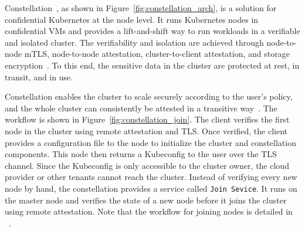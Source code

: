Constellation~\cite*{Constellation}, as shown in Figure~\ref{fig:constellation_arch}, is a solution for confidential Kubernetes at the node level. It runs Kubernetes nodes in confidential VMs and provides a lift-and-shift way to run workloads in a verifiable and isolated cluster. The verifiability 
and isolation are achieved through node-to-node mTLS, node-to-node attestation, cluster-to-client attestation, and storage encryption~\cite*{Constellation_Encrypted_Kubernetes}. To this end, the sensitive data in the cluster are protected at rest, in transit, and in use. 
 


Constellation enables the cluster to scale securely according to the user's policy, and the whole cluster can consistently be attested in a transitive way~\cite*{constellation_join_Node}. The workflow is shown in Figure~\ref{fig:constellation_join}. The client verifies the first node in the 
cluster using remote attestation and TLS. Once verified, the client provides a configuration file to the node to initialize the cluster and constellation components. This node then returns a Kubeconfig to the user over the TLS channel. Since the Kubeconfig is only accessible to the cluster owner, 
the cloud provider or other tenants cannot reach the cluster. Instead of verifying every new node by hand, the constellation provides a service called \texttt{Join Sevice}. It runs on the master node and verifies the state of a new node before it joins the cluster using remote attestation. 
Note that the workflow for joining nodes is detailed in ~\cite*{constellation_join_Node}.
